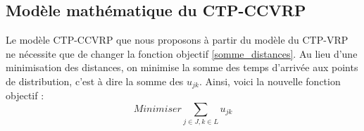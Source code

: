 \documentclass[5p,authoryear,square]{elsarticle}
\begin{document}
\subsection{Modèle mathématique du CTP-CCVRP} \label{modele_ctpccvrp}
Le modèle CTP-CCVRP que nous proposons à partir du modèle du CTP-VRP ne nécessite que de changer la fonction objectif \cref{somme_distances}. Au lieu d'une minimisation des distances, on minimise la somme des temps d'arrivée aux points de distribution, c'est à dire la somme des $u_{jk}$. Ainsi, voici la nouvelle fonction objectif :
\begin{equation} \label{somme_temps_arrivee}
Minimiser \sum_{j \in J, k \in L} u_{jk}
\end{equation}



\end{document}
